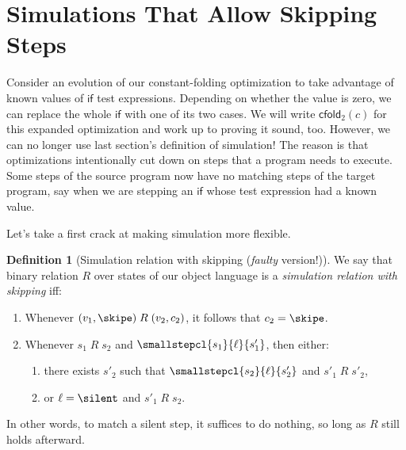 \documentclass{amsbook}
\theoremstyle{definition}
\newtheorem{definition}[theorem]{Definition}
\theoremstyle{remark}
\numberwithin{section}{chapter}
\numberwithin{equation}{chapter}
\begin{document}
\section{Simulations That Allow Skipping Steps}

\newcommand{\cfoldt}[1]{\mathsf{cfold}_2(#1)}

Consider an evolution of our constant-folding optimization to take advantage of known values of $\mathsf{if}$ test expressions.
Depending on whether the value is zero, we can replace the whole $\mathsf{if}$ with one of its two cases.
We will write $\cfoldt{c}$ for this expanded optimization and work up to proving it sound, too.
However, we can no longer use last section's definition of simulation!
The reason is that optimizations intentionally cut down on steps that a program needs to execute.
Some steps of the source program now have no matching steps of the target program, say when we are stepping an $\mathsf{if}$ whose test expression had a known value.

Let's take a first crack at making simulation more flexible.

\begin{definition}[Simulation relation with skipping (\emph{faulty} version!)]
  We say that binary relation $R$ over states of our object language is a \emph{simulation relation with skipping} iff:
  \begin{enumerate}
    \item Whenever $(v_1, \skipe) \; R \; (v_2, c_2)$, it follows that $c_2 = \skipe$.
    \item Whenever $s_1 \; R \; s_2$ and $\smallstepcl{s_1}{\ell}{s'_1}$, then either:
      \begin{enumerate}
        \item there exists $s'_2$ such that $\smallstepcl{s_2}{\ell}{s'_2}$ and $s'_1 \; R \; s'_2$,
        \item or $\ell = \silent$ and $s'_1 \; R \; s_2$.
      \end{enumerate}
  \end{enumerate}
\end{definition}

In other words, to match a silent step, it suffices to do nothing, so long as $R$ still holds afterward.

\newcommand{\addad}[1]{\mathsf{withAds}(#1)}
\end{document}
